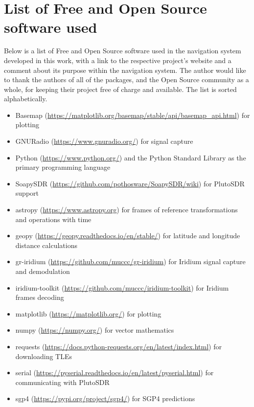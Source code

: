 \chapter{List of Free and Open Source software used}
Below is a list of Free and Open Source software used in the navigation system developed in this work, with a link to the respective project's website and a comment about its purpose within the navigation system. The author would like to thank the authors of all of the packages, and the Open Source community as a whole, for keeping their project free of charge and available. The list is sorted alphabetically.

\begin{itemize}
\setlength\itemsep{0em}
    \item Basemap (\url{https://matplotlib.org/basemap/stable/api/basemap_api.html}) for plotting
    \item GNURadio (\url{https://www.gnuradio.org/}) for signal capture
    \item Python (\url{https://www.python.org/}) and the Python Standard Library as the primary programming language
    \item SoapySDR (\url{https://github.com/pothosware/SoapySDR/wiki}) for PlutoSDR support
    \item astropy (\url{https://www.astropy.org}) for frames of reference transformations and operations with time
    \item geopy (\url{https://geopy.readthedocs.io/en/stable/}) for latitude and longitude distance calculations
    \item gr-iridium (\url{https://github.com/muccc/gr-iridium}) for Iridium signal capture and demodulation
    \item iridium-toolkit (\url{https://github.com/muccc/iridium-toolkit}) for Iridium frames decoding
    \item matplotlib (\url{https://matplotlib.org/}) for plotting
    \item numpy (\url{https://numpy.org/}) for vector mathematics
    \item requests (\url{https://docs.python-requests.org/en/latest/index.html}) for downloading TLEs
    \item serial (\url{https://pyserial.readthedocs.io/en/latest/pyserial.html}) for communicating with PlutoSDR
    \item sgp4 (\url{https://pypi.org/project/sgp4/}) for SGP4 predictions
\end{itemize}
